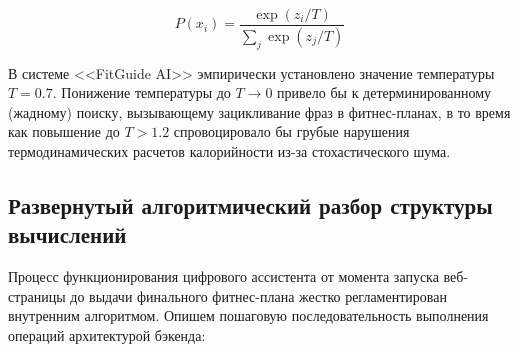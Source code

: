 \documentclass[14pt, a4paper]{extarticle}
\begin{document}
\begin{equation}\label{softmax_temp}
P(x_i) = \frac{\exp(z_i / T)}{\sum_{j} \exp(z_j / T)}
\end{equation}

В системе <<FitGuide AI>> эмпирически установлено значение температуры $T = 0.7$. Понижение температуры до $T \to 0$ привело бы к детерминированному (жадному) поиску, вызывающему зацикливание фраз в фитнес-планах, в то время как повышение до $T > 1.2$ спровоцировало бы грубые нарушения термодинамических расчетов калорийности из-за стохастического шума.

\subsection{Развернутый алгоритмический разбор структуры вычислений}

Процесс функционирования цифрового ассистента от момента запуска веб-страницы до выдачи финального фитнес-плана жестко регламентирован внутренним алгоритмом. Опишем пошаговую последовательность выполнения операций архитектурой бэкенда:
\end{document}
